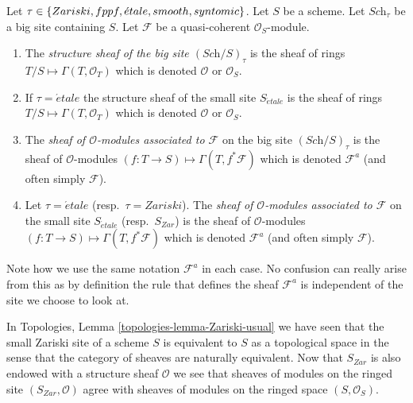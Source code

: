 \begin{definition}
\label{definition-structure-sheaf}
Let $\tau \in \{Zariski,\linebreak[0] fppf,\linebreak[0]
\acute{e}tale,\linebreak[0] smooth,\linebreak[0] syntomic\}$.
Let $S$ be a scheme.
Let $\textit{Sch}_\tau$ be a big site containing $S$.
Let $\mathcal{F}$ be a quasi-coherent $\mathcal{O}_S$-module.
\begin{enumerate}
\item The {\it structure sheaf of the big site $(\textit{Sch}/S)_\tau$}
is the sheaf of rings $T/S \mapsto \Gamma(T, \mathcal{O}_T)$ which is
denoted $\mathcal{O}$ or $\mathcal{O}_S$.
\item If $\tau = \acute{e}tale$ the structure sheaf of the small site
$S_{\acute{e}tale}$ is the sheaf of rings $T/S \mapsto \Gamma(T, \mathcal{O}_T)$
which is denoted $\mathcal{O}$ or $\mathcal{O}_S$.
\item The {\it sheaf of $\mathcal{O}$-modules associated to
$\mathcal{F}$} on the big site $(\textit{Sch}/S)_\tau$
is the sheaf of $\mathcal{O}$-modules
$(f : T \to S) \mapsto \Gamma(T, f^*\mathcal{F})$
which is denoted $\mathcal{F}^a$ (and often simply $\mathcal{F}$).
\item Let $\tau = \acute{e}tale$ (resp.\ $\tau = Zariski$). The
{\it sheaf of $\mathcal{O}$-modules associated to $\mathcal{F}$}
on the small site $S_{\acute{e}tale}$ (resp.\ $S_{Zar}$) is the sheaf of
$\mathcal{O}$-modules $(f : T \to S) \mapsto \Gamma(T, f^*\mathcal{F})$
which is denoted $\mathcal{F}^a$ (and often simply $\mathcal{F}$).
\end{enumerate}
\end{definition}

\noindent
Note how we use the same notation $\mathcal{F}^a$ in each case.
No confusion can really arise from this as by definition the rule
that defines the sheaf $\mathcal{F}^a$ is independent of the site
we choose to look at.

\begin{remark}
\label{remark-Zarsiki-site-space}
In Topologies, Lemma \ref{topologies-lemma-Zariski-usual}
we have seen that the small Zariski site of a scheme $S$ is
equivalent to $S$ as a topological space in the sense that the
category of sheaves are naturally equivalent. Now that $S_{Zar}$
is also endowed with a structure sheaf $\mathcal{O}$ we see
that sheaves of modules on the ringed site $(S_{Zar}, \mathcal{O})$
agree with sheaves of modules on the ringed space $(S, \mathcal{O}_S)$.
\end{remark}

